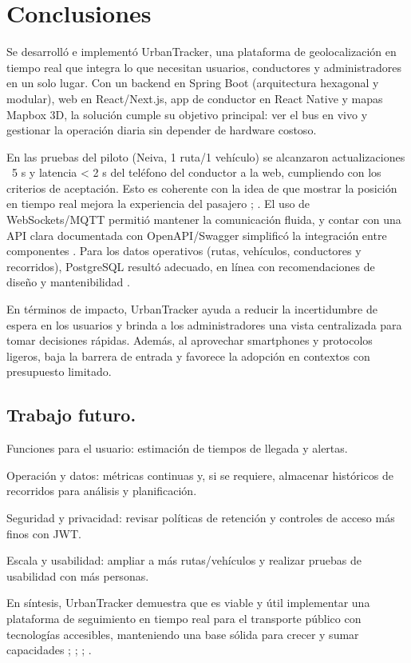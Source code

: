 \section{Conclusiones}
Se desarrolló e implementó UrbanTracker, una plataforma de geolocalización en tiempo real que integra lo que necesitan usuarios, conductores y administradores en un solo lugar. Con un backend en Spring Boot (arquitectura hexagonal y modular), web en React/Next.js, app de conductor en React Native y mapas Mapbox 3D, la solución cumple su objetivo principal: ver el bus en vivo y gestionar la operación diaria sin depender de hardware costoso.

En las pruebas del piloto (Neiva, 1 ruta/1 vehículo) se alcanzaron actualizaciones ~5 s y latencia < 2 s del teléfono del conductor a la web, cumpliendo con los criterios de aceptación. Esto es coherente con la idea de que mostrar la posición en tiempo real mejora la experiencia del pasajero \cite{cityruta2018}; \cite{stopbus2016}. El uso de WebSockets/MQTT permitió mantener la comunicación fluida, y contar con una API clara documentada con OpenAPI/Swagger simplificó la integración entre componentes \cite{easyrest2022}. Para los datos operativos (rutas, vehículos, conductores y recorridos), PostgreSQL resultó adecuado, en línea con recomendaciones de diseño y mantenibilidad \cite{ingenieria2022}.

En términos de impacto, UrbanTracker ayuda a reducir la incertidumbre de espera en los usuarios y brinda a los administradores una vista centralizada para tomar decisiones rápidas. Además, al aprovechar smartphones y protocolos ligeros, baja la barrera de entrada y favorece la adopción en contextos con presupuesto limitado.

\subsection{Trabajo futuro.}
Funciones para el usuario: estimación de tiempos de llegada y alertas.

Operación y datos: métricas continuas y, si se requiere, almacenar históricos de recorridos para análisis y planificación.

Seguridad y privacidad: revisar políticas de retención y controles de acceso más finos con JWT.

Escala y usabilidad: ampliar a más rutas/vehículos y realizar pruebas de usabilidad con más personas.

En síntesis, UrbanTracker demuestra que es viable y útil implementar una plataforma de seguimiento en tiempo real para el transporte público con tecnologías accesibles, manteniendo una base sólida para crecer y sumar capacidades \cite{cityruta2018}; \cite{stopbus2016}; \cite{easyrest2022}; \cite{ingenieria2022}.